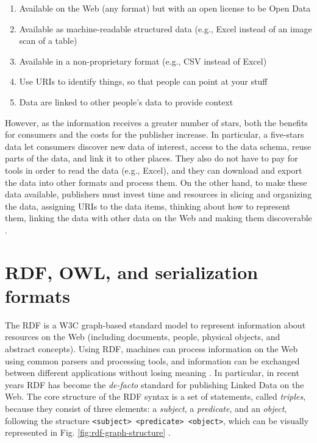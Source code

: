 \begin{enumerate}[%
align=right,
leftmargin=*,
labelindent=\widthof{\Stars{5}}
]
    \item[\Stars{1}] Available on the Web (any format) but with an open license to be Open Data
    \item[\Stars{2}] Available as machine-readable structured data (e.g., Excel instead of an image scan of a table)
    \item[\Stars{3}] Available in a non-proprietary format (e.g., \acs{CSV} instead of Excel)
    \item[\Stars{4}] Use \acp{URI} to identify things, so that people can point at your stuff
    \item[\Stars{5}] Data are linked to other people's data to provide context
\end{enumerate}

However, as the information receives a greater number of stars, both the benefits for consumers and the costs for the publisher increase. In particular, a five-stars data let consumers discover new data of interest, access to the data schema, reuse parts of the data, and link it to other places. They also do not have to pay for tools in order to read the data (e.g., Excel), and they can download and export the data into other formats and process them. On the other hand, to make these data available, publishers must invest time and resources in slicing and organizing the data, assigning \acp{URI} to the data items, thinking about how to represent them, linking the data with other data on the Web and making them discoverable \cite{bauer2011linked}.

\section{RDF, OWL, and serialization formats}
\label{sec:rdf-owl-formats}

The \acf{RDF} is a \ac{W3C} graph-based standard model to represent information about resources on the Web (including documents, people, physical objects, and abstract concepts). Using \ac{RDF}, machines can process information on the Web using common parsers and processing tools, and information can be exchanged between different applications without losing meaning \cite{world2014rdfprimer}. In particular, in recent years \ac{RDF} has become the \textit{de-facto} standard for publishing Linked Data on the Web. The core structure of the \ac{RDF} syntax is a set of statements, called \textit{triples}, because they consist of three elements: a \textit{subject}, a \textit{predicate}, and an \textit{object}, following the structure \verb#<subject> <predicate> <object>#, which can be visually represented in Fig. \ref{fig:rdf-graph-structure} \cite{world2014rdfconcepts}.

